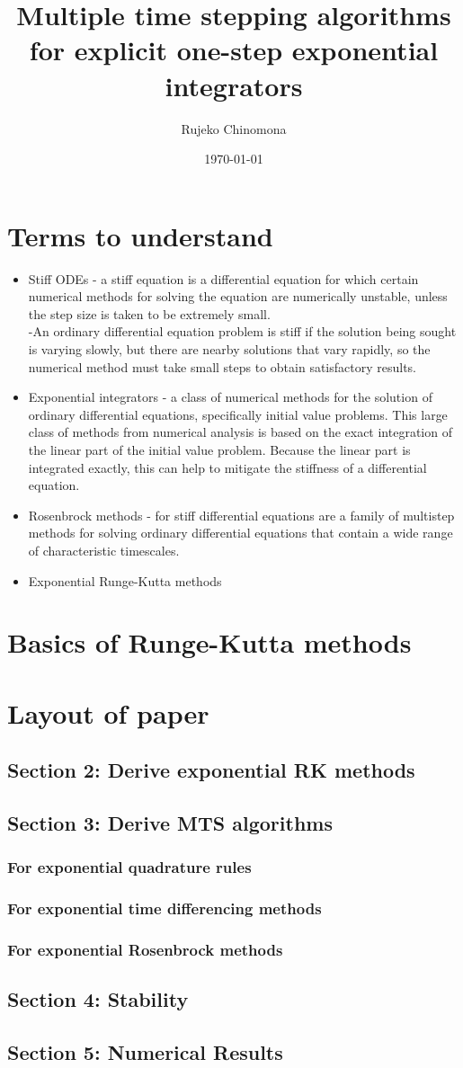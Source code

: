 \documentclass[12pt]{article}
\title{Multiple time stepping algorithms for explicit one-step exponential integrators}
\author{Rujeko Chinomona}
\date{\today }
\begin{document}
\maketitle
\section{Terms to understand}
\begin{itemize}
\item Stiff ODEs - a stiff equation is a differential equation for which certain numerical methods for solving the equation are numerically unstable, unless the step size is taken to be extremely small.\\
-An ordinary differential equation problem is stiff if the solution being sought is varying slowly, but there are nearby solutions that vary rapidly, so the numerical method must take small steps to obtain satisfactory results.
\item Exponential integrators -  a class of numerical methods for the solution of ordinary differential equations, specifically initial value problems. This large class of methods from numerical analysis is based on the exact integration of the linear part of the initial value problem. Because the linear part is integrated exactly, this can help to mitigate the stiffness of a differential equation. 
\item Rosenbrock methods  - for stiff differential equations are a family of multistep methods for solving ordinary differential equations that contain a wide range of characteristic timescales.
\item Exponential Runge-Kutta methods
\end{itemize}
\section{Basics of Runge-Kutta methods}
\section{Layout of paper}
\subsection{Section 2: Derive exponential RK methods}
\subsection{Section 3: Derive MTS algorithms}
\subsubsection{For exponential quadrature rules}
\subsubsection{For exponential time differencing methods}
\subsubsection{For exponential Rosenbrock methods}
\subsection{Section 4: Stability}
\subsection{Section 5: Numerical Results} 
\end{document}
